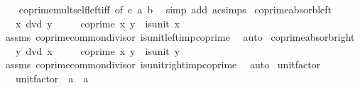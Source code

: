\begin{isabellebody}
%
\isadelimproof
\ \ %
\endisadelimproof
%
\isatagproof
{}\isamarkupfalse%
\ coprime{\isacharunderscore}{\kern0pt}mult{\isacharunderscore}{\kern0pt}self{\isacharunderscore}{\kern0pt}left{\isacharunderscore}{\kern0pt}iff\ {\isacharbrackleft}{\kern0pt}of\ c\ a\ b{\isacharbrackright}{\kern0pt}\ \isamarkupfalse%
\ {\isacharparenleft}{\kern0pt}simp\ add{\isacharcolon}{\kern0pt}\ ac{\isacharunderscore}{\kern0pt}simps{\isacharparenright}{\kern0pt}%
\endisatagproof
{\isafoldproof}%
%
\isadelimproof
\isanewline
%
\endisadelimproof
\isanewline
{}\isamarkupfalse%
\ coprime{\isacharunderscore}{\kern0pt}absorb{\isacharunderscore}{\kern0pt}left{\isacharcolon}{\kern0pt}\isanewline
\ \ \ {\isachardoublequoteopen}x\ dvd\ y{\isachardoublequoteclose}\isanewline
\ \ \ \ \ {\isachardoublequoteopen}coprime\ x\ y\ {\isasymlongleftrightarrow}\ is{\isacharunderscore}{\kern0pt}unit\ x{\isachardoublequoteclose}\isanewline
%
\isadelimproof
\ \ %
\endisadelimproof
%
\isatagproof
{}\isamarkupfalse%
\ assms\ coprime{\isacharunderscore}{\kern0pt}common{\isacharunderscore}{\kern0pt}divisor\ is{\isacharunderscore}{\kern0pt}unit{\isacharunderscore}{\kern0pt}left{\isacharunderscore}{\kern0pt}imp{\isacharunderscore}{\kern0pt}coprime\ \isamarkupfalse%
\ auto%
\endisatagproof
{\isafoldproof}%
%
\isadelimproof
\isanewline
%
\endisadelimproof
\isanewline
{}\isamarkupfalse%
\ coprime{\isacharunderscore}{\kern0pt}absorb{\isacharunderscore}{\kern0pt}right{\isacharcolon}{\kern0pt}\isanewline
\ \ \ {\isachardoublequoteopen}y\ dvd\ x{\isachardoublequoteclose}\isanewline
\ \ \ \ \ {\isachardoublequoteopen}coprime\ x\ y\ {\isasymlongleftrightarrow}\ is{\isacharunderscore}{\kern0pt}unit\ y{\isachardoublequoteclose}\isanewline
%
\isadelimproof
\ \ %
\endisadelimproof
%
\isatagproof
{}\isamarkupfalse%
\ assms\ coprime{\isacharunderscore}{\kern0pt}common{\isacharunderscore}{\kern0pt}divisor\ is{\isacharunderscore}{\kern0pt}unit{\isacharunderscore}{\kern0pt}right{\isacharunderscore}{\kern0pt}imp{\isacharunderscore}{\kern0pt}coprime\ \isamarkupfalse%
\ auto%
\endisatagproof
{\isafoldproof}%
%
\isadelimproof
\isanewline
%
\endisadelimproof
\isanewline
{}\isamarkupfalse%
\isanewline
\isanewline
{}\isamarkupfalse%
\ unit{\isacharunderscore}{\kern0pt}factor\ {\isacharequal}{\kern0pt}\isanewline
\ \ \ unit{\isacharunderscore}{\kern0pt}factor\ {\isacharcolon}{\kern0pt}{\isacharcolon}{\kern0pt}\ {\isachardoublequoteopen}{\isacharprime}{\kern0pt}a\ {\isasymRightarrow}\ {\isacharprime}{\kern0pt}a{\isachardoublequoteclose}\isanewline

\end{isabellebody}
